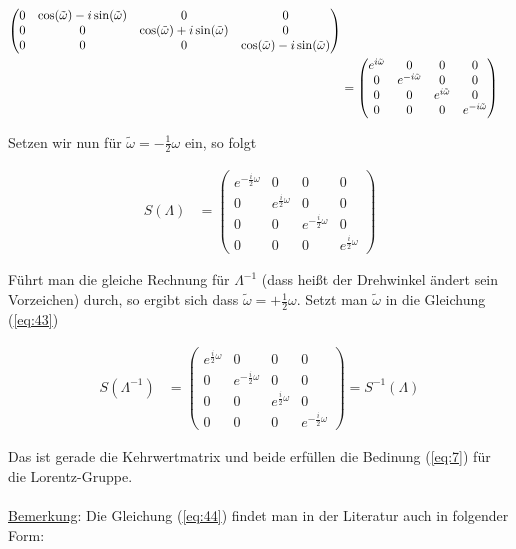 \begin{align}
\begin{pmatrix}
   0&\cos(\tilde\omega)-i\sin(\tilde\omega) &0&0\\ 
   0&0&\cos(\tilde\omega)+i\sin(\tilde\omega) &0\\
   0&0&0& \cos(\tilde\omega)-i\sin(\tilde\omega) 
 \end{pmatrix}\notag \\
  &= \begin{pmatrix}e^{i\tilde\omega} &0&0&0\\
   0& e^{-i\tilde\omega} &0&0\\ 
   0&0& e^{i\tilde\omega} &0\\
   0&0&0& e^{-i\tilde\omega} 
 \end{pmatrix}
\end{align}

Setzen wir nun für \(\tilde\omega=-\frac{1}{2}\omega \) ein, so folgt

\begin{align}
  \label{eq:44}
  S(\Lambda)&= \begin{pmatrix}e^{- \frac{i}{2} \omega} &0&0&0\\
   0& e^{\frac{i}{2} \omega} &0&0\\ 
   0&0& e^{-\frac{i}{2}\omega} &0\\
   0&0&0& e^{\frac{i}{2}\omega} 
 \end{pmatrix} 
\end{align}

Führt man die gleiche Rechnung für \(\Lambda^{-1}\) (dass heißt der Drehwinkel ändert sein Vorzeichen) durch, so ergibt sich dass \(\tilde\omega=+\frac{1}{2}\omega\). Setzt man \(\tilde\omega\) in die Gleichung (\ref{eq:43}) 

\begin{align}
  \label{eq:45}
   S(\Lambda^{-1})&= \begin{pmatrix}e^{ \frac{i}{2} \omega} &0&0&0\\
   0& e^{-\frac{i}{2} \omega} &0&0\\ 
   0&0& e^{\frac{i}{2}\omega} &0\\
   0&0&0& e^{-\frac{i}{2}\omega} 
 \end{pmatrix} = S^{-1}(\Lambda)
\end{align}

Das ist gerade die Kehrwertmatrix und beide erfüllen die Bedinung (\ref{eq:7}) für die Lorentz-Gruppe.\\
\\
\underline{Bemerkung}: Die Gleichung (\ref{eq:44}) findet man in der Literatur auch in folgender Form:

